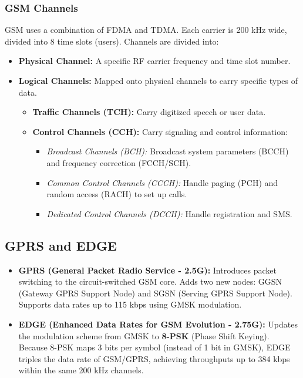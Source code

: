 \documentclass[12pt,a4paper]{article}
\begin{document}
\subsubsection{GSM Channels}
GSM uses a combination of FDMA and TDMA. Each carrier is 200 kHz wide, divided into 8 time slots (users). Channels are divided into:
\begin{itemize}[leftmargin=*, itemsep=3.0pt]
  \item \textbf{Physical Channel:} A specific RF carrier frequency and time slot number.
  \item \textbf{Logical Channels:} Mapped onto physical channels to carry specific types of data.
    \begin{itemize}[leftmargin=*, itemsep=2.5pt, topsep=2pt]
      \item \textbf{Traffic Channels (TCH):} Carry digitized speech or user data.
      \item \textbf{Control Channels (CCH):} Carry signaling and control information:
        \begin{itemize}[leftmargin=*, itemsep=2pt, topsep=2pt]
          \item \textit{Broadcast Channels (BCH):} Broadcast system parameters (BCCH) and frequency correction (FCCH/SCH).
          \item \textit{Common Control Channels (CCCH):} Handle paging (PCH) and random access (RACH) to set up calls.
          \item \textit{Dedicated Control Channels (DCCH):} Handle registration and SMS.
        \end{itemize}
    \end{itemize}
\end{itemize}

\subsection{GPRS and EDGE}
\begin{itemize}[leftmargin=*, itemsep=3pt]
  \item \textbf{GPRS (General Packet Radio Service - 2.5G):} Introduces packet switching to the circuit-switched GSM core. Adds two new nodes: GGSN (Gateway GPRS Support Node) and SGSN (Serving GPRS Support Node). Supports data rates up to 115 kbps using GMSK modulation.
  \item \textbf{EDGE (Enhanced Data Rates for GSM Evolution - 2.75G):} Updates the modulation scheme from GMSK to \textbf{8-PSK} (Phase Shift Keying). Because 8-PSK maps 3 bits per symbol (instead of 1 bit in GMSK), EDGE triples the data rate of GSM/GPRS, achieving throughputs up to 384 kbps within the same 200 kHz channels.
\end{itemize}
\end{document}
